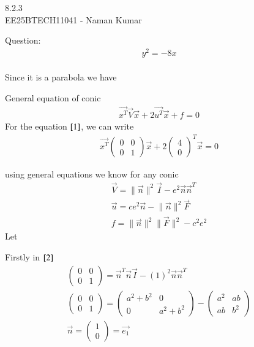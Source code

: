 \documentclass[a5paper,10pt]{article}
\author{EE25BTECH11041-Naman Kumar }
\begin{document}
\begin{center}
    \huge{8.2.3}\\
    \large{EE25BTECH11041 - Naman Kumar}
\end{center}
Question:\\
\begin{align}
y^2 = -8x \label{1} 
\end{align}
\solution \\
Since it is a parabola we have

General equation of conic
\begin{align}
    \vec{x^T}\vec{V}\vec{x}+2\vec{u^T}\vec{x}+f=0
\end{align}
For the equation $\eqref{1}$, we can write
\begin{align}
    \vec{x^T}\begin{pmatrix}0&0\\0&1\end{pmatrix}\vec{x}+2\begin{pmatrix}4\\0\end{pmatrix}^T\vec{x}=0
\end{align}

using general equations we know for any conic
\begin{align}
    \vec{V}=\lVert\vec{n}\rVert^2\vec{I}-e^2\vec{n}\vec{n}^T \label{2} \\
    \vec{u}=ce^2\vec{n}-\lVert\vec{n}\rVert^2\vec{F} \label{3} \\
    f=\lVert\vec{n}\rVert^2\lVert\vec{F}\rVert^2-c^2e^2 \label{4}
\end{align}
Let

Firstly in $\eqref{2}$
\begin{align}
    \begin{pmatrix}0&0\\0&1\end{pmatrix}=\vec{n}^T\vec{n}\vec{I}-(1)^2\vec{n}\vec{n}^T\\
    \begin{pmatrix}0&0\\0&1\end{pmatrix}=\begin{pmatrix}a^2+b^2&0\\0&a^2+b^2\end{pmatrix}-\begin{pmatrix}a^2&ab\\ab&b^2\end{pmatrix}\\
    \vec{n}=\begin{pmatrix}1\\0\end{pmatrix}=\vec{e_1}
\end{align}
\end{document}
